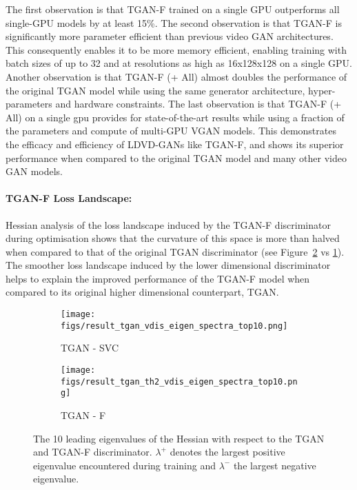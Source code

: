 \documentclass[a4paper,fleqn]{cas-sc}
\begin{document}
The first observation is that TGAN-F trained on a single GPU outperforms all single-GPU models by at least 15\%.  The second observation is that TGAN-F is significantly more parameter efficient than previous video GAN architectures. This consequently enables it to be more memory efficient, enabling training with batch sizes of up to 32 and at resolutions as high as 16x128x128 on a single GPU. Another observation is that TGAN-F (+ All) almost doubles the performance of the original TGAN model while using the same generator architecture, hyper-parameters and hardware constraints. The last observation is that TGAN-F (+ All) on a single gpu provides for state-of-the-art results while using a fraction of the parameters and compute of multi-GPU VGAN models. This demonstrates the efficacy and efficiency of LDVD-GANs like TGAN-F, and shows its superior performance when compared to the original TGAN model and many other video GAN models.

\paragraph{TGAN-F Loss Landscape:} Hessian analysis of the loss landscape induced by the TGAN-F discriminator during optimisation shows that the curvature of this space is more than halved when compared to that of the original TGAN discriminator (see Figure~\ref{fig:TGAN_F_EV_comp} vs \ref{fig:TGAN_EV_comp}). 
The smoother loss landscape induced by the lower dimensional discriminator helps to explain the improved performance of the TGAN-F model when compared to its original higher dimensional counterpart, TGAN. 

\begin{figure}[pos=!h]
    \centering
    \begin{subfigure}[t]{0.5\textwidth}
        \centering
        \texttt{[image: figs/result\_tgan\_vdis\_eigen\_spectra\_top10.png]}
        \caption{TGAN - SVC}
        \label{fig:TGAN_EV_comp}
    \end{subfigure}\begin{subfigure}[t]{0.5\textwidth}
        \centering
        \texttt{[image: figs/result\_tgan\_th2\_vdis\_eigen\_spectra\_top10.png]}
        \caption{TGAN - F}
        \label{fig:TGAN_F_EV_comp}
    \end{subfigure}
\caption{The 10 leading eigenvalues of the Hessian with respect to the TGAN and TGAN-F discriminator.  $\lambda^{+}$ denotes the largest positive eigenvalue encountered during training and $\lambda^{-}$ the largest negative eigenvalue.} 
    \label{fig:TGAN_EV_Comp}
\end{figure}
\end{document}
